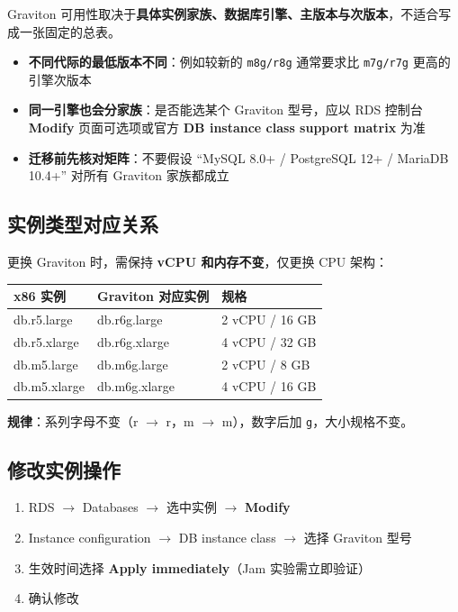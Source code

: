 \documentclass[12pt, a4paper]{article}
\begin{document}
Graviton 可用性取决于\textbf{具体实例家族、数据库引擎、主版本与次版本}，不适合写成一张固定的总表。

\begin{itemize}[leftmargin=2em]
  \item \textbf{不同代际的最低版本不同}：例如较新的 \texttt{m8g/r8g} 通常要求比 \texttt{m7g/r7g} 更高的引擎次版本
  \item \textbf{同一引擎也会分家族}：是否能选某个 Graviton 型号，应以 RDS 控制台 \textbf{Modify} 页面可选项或官方 \textbf{DB instance class support matrix} 为准
  \item \textbf{迁移前先核对矩阵}：不要假设 ``MySQL 8.0+ / PostgreSQL 12+ / MariaDB 10.4+'' 对所有 Graviton 家族都成立
\end{itemize}

\subsection{实例类型对应关系}

更换 Graviton 时，需保持 \textbf{vCPU 和内存不变}，仅更换 CPU 架构：

\begin{center}
\begin{tabular}{lll}
\toprule
\textbf{x86 实例} & \textbf{Graviton 对应实例} & \textbf{规格} \\
\midrule
db.r5.large  & db.r6g.large  & 2 vCPU / 16 GB \\
db.r5.xlarge & db.r6g.xlarge & 4 vCPU / 32 GB \\
db.m5.large  & db.m6g.large  & 2 vCPU / 8 GB  \\
db.m5.xlarge & db.m6g.xlarge & 4 vCPU / 16 GB \\
\bottomrule
\end{tabular}
\end{center}

\textbf{规律}：系列字母不变（r $\to$ r，m $\to$ m），数字后加 \texttt{g}，大小规格不变。

\subsection{修改实例操作}

\begin{enumerate}[leftmargin=2em]
  \item RDS $\to$ Databases $\to$ 选中实例 $\to$ \textbf{Modify}
  \item Instance configuration $\to$ DB instance class $\to$ 选择 Graviton 型号
  \item 生效时间选择 \textbf{Apply immediately}（Jam 实验需立即验证）
  \item 确认修改
\end{enumerate}
\end{document}

